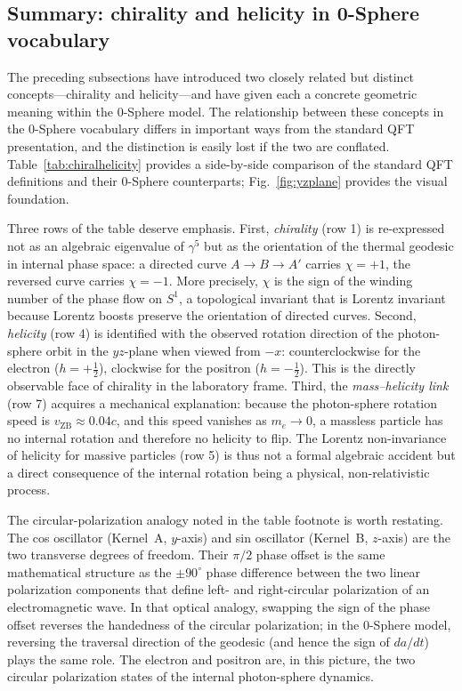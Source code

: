 \documentclass[%
 reprint, amsmath,amssymb, aps, prb, ]{revtex4-2}
\numberwithin{equation}{section}
\begin{document}
\subsection{Summary: chirality and helicity in 0-Sphere vocabulary}

The preceding subsections have introduced two closely related but distinct concepts---chirality and helicity---and have given each a concrete geometric meaning within the 0-Sphere model.
The relationship between these concepts in the 0-Sphere vocabulary differs in important ways from the standard QFT presentation, and the distinction is easily lost if the two are conflated.
Table~\ref{tab:chiralhelicity} provides a side-by-side comparison of the standard QFT definitions and their 0-Sphere counterparts; Fig.~\ref{fig:yzplane} provides the visual foundation.

Three rows of the table deserve emphasis.
First, \emph{chirality} (row 1) is re-expressed not as an algebraic eigenvalue of $\gamma^5$ but as the orientation of the thermal geodesic in internal phase space: a directed curve $A\to B\to A'$ carries $\chi=+1$, the reversed curve carries $\chi=-1$. More precisely, $\chi$ is the sign of the winding number of the phase flow on $S^1$, a topological invariant that is Lorentz invariant because Lorentz boosts preserve the orientation of directed curves.
Second, \emph{helicity} (row 4) is identified with the observed rotation direction of the photon-sphere orbit in the $yz$-plane when viewed from $-x$: counterclockwise for the electron ($h=+\tfrac{1}{2}$), clockwise for the positron ($h=-\tfrac{1}{2}$).
This is the directly observable face of chirality in the laboratory frame.
Third, the \emph{mass--helicity link} (row 7) acquires a mechanical explanation: because the photon-sphere rotation speed is $v_{\mathrm{ZB}}\approx 0.04c$, and this speed vanishes as $m_e\to 0$, a massless particle has no internal rotation and therefore no helicity to flip.
The Lorentz non-invariance of helicity for massive particles (row 5) is thus not a formal algebraic accident but a direct consequence of the internal rotation being a physical, non-relativistic process.

The circular-polarization analogy noted in the table footnote is worth restating.
The cos oscillator (Kernel~A, $y$-axis) and sin oscillator (Kernel~B, $z$-axis) are the two transverse degrees of freedom.
Their $\pi/2$ phase offset is the same mathematical structure as the $\pm 90^{\circ}$ phase difference between the two linear polarization components that define left- and right-circular polarization of an electromagnetic wave.
In that optical analogy, swapping the sign of the phase offset reverses the handedness of the circular polarization; in the 0-Sphere model, reversing the traversal direction of the geodesic (and hence the sign of $da/dt$) plays the same role.
The electron and positron are, in this picture, the two circular polarization states of the internal photon-sphere dynamics.
\end{document}
